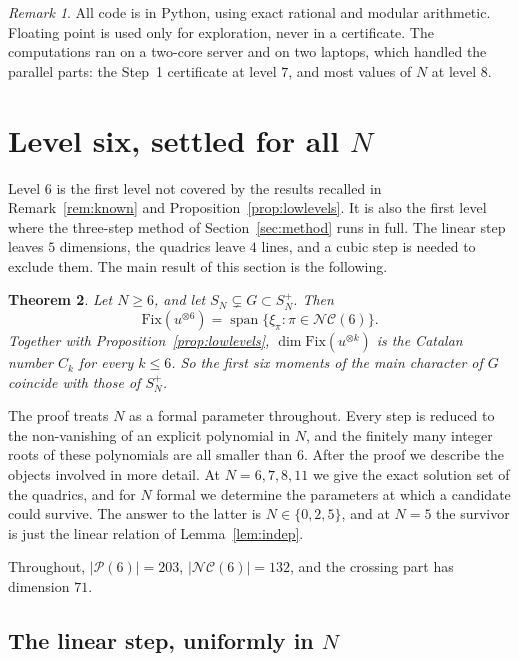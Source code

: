 \documentclass[11pt]{amsart}
\newtheorem{theorem}{Theorem}[section]
\theoremstyle{definition}
\theoremstyle{remark}
\newtheorem{remark}[theorem]{Remark}
\theoremstyle{plain}
\numberwithin{equation}{section}
\numberwithin{table}{section}
\newcommand{\Fix}{\mathrm{Fix}}
\newcommand{\NC}{\mathcal{NC}}
\newcommand{\Pp}{\mathcal{P}}
\DeclareMathOperator{\spn}{span}
\begin{document}
\begin{remark}
All code is in Python, using exact rational and modular arithmetic. Floating point is used only for exploration, never in a certificate. The computations ran on a two-core server and on two laptops, which handled the parallel parts: the Step~1 certificate at level $7$, and most values of $N$ at level $8$.
\end{remark}



\section{Level six, settled for all \texorpdfstring{$N$}{N}}\label{sec:six}

Level $6$ is the first level not covered by the results recalled in Remark~\ref{rem:known} and Proposition~\ref{prop:lowlevels}. It is also the first level where the three-step method of Section~\ref{sec:method} runs in full. The linear step leaves $5$ dimensions, the quadrics leave $4$ lines, and a cubic step is needed to exclude them. The main result of this section is the following.

\begin{theorem}\label{thm:levelsix}
Let $N\ge6$, and let $S_N\subsetneq G\subset S_N^+$. Then
\[
\Fix(u^{\otimes6})=\spn\{\xi_\pi:\pi\in\NC(6)\}.
\]
Together with Proposition~\ref{prop:lowlevels}, $\dim\Fix(u^{\otimes k})$ is the Catalan number $C_k$ for every $k\le6$. So the first six moments of the main character of $G$ coincide with those of $S_N^+$.
\end{theorem}

The proof treats $N$ as a formal parameter throughout. Every step is reduced to the non-vanishing of an explicit polynomial in $N$, and the finitely many integer roots of these polynomials are all smaller than $6$. After the proof we describe the objects involved in more detail. At $N=6,7,8,11$ we give the exact solution set of the quadrics, and for $N$ formal we determine the parameters at which a candidate could survive. The answer to the latter is $N\in\{0,2,5\}$, and at $N=5$ the survivor is just the linear relation of Lemma~\ref{lem:indep}.

Throughout, $|\Pp(6)|=203$, $|\NC(6)|=132$, and the crossing part has dimension $71$.

\subsection{The linear step, uniformly in $N$}
\end{document}
